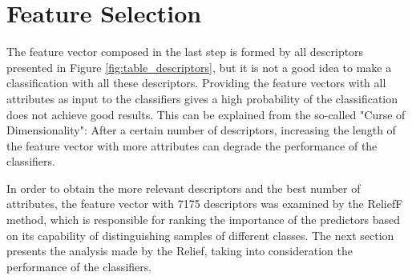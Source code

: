 \documentclass[conference]{IEEEtran}
\begin{document}
	\section{Feature Selection}
        \par The feature vector composed in the last step is formed by all descriptors presented in Figure \ref{fig:table_descriptors}, but it is not a good idea to make a classification with all these descriptors. Providing the feature vectors with all attributes as input to the classifiers gives a high probability of the classification does not achieve good results. This can be explained from the so-called "Curse of Dimensionality": After a certain number of descriptors, increasing the length of the feature vector with more attributes can degrade the performance of the classifiers.
		\par In order to obtain the more relevant descriptors and the best number of attributes, the feature vector with 7175 descriptors was examined by the ReliefF method, which is responsible for ranking the importance of the predictors based on its capability of distinguishing samples of different classes. The next section presents the analysis made by the Relief, taking into consideration the performance of the classifiers.
\end{document}
